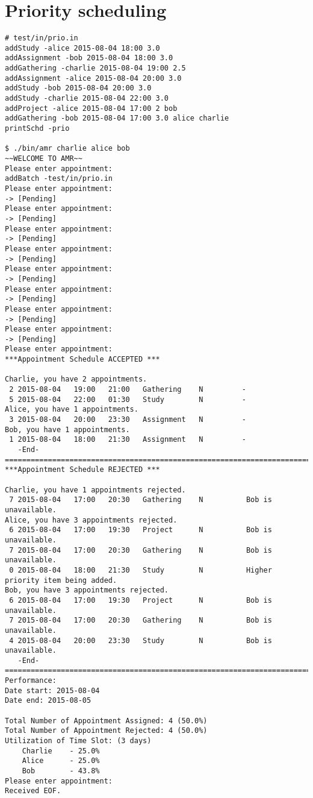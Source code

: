 \documentclass[12pt,a4paper]{report}
\begin{document}
\section{Priority scheduling}
\begin{lstlisting}
# test/in/prio.in
addStudy -alice 2015-08-04 18:00 3.0
addAssignment -bob 2015-08-04 18:00 3.0
addGathering -charlie 2015-08-04 19:00 2.5
addAssignment -alice 2015-08-04 20:00 3.0
addStudy -bob 2015-08-04 20:00 3.0
addStudy -charlie 2015-08-04 22:00 3.0
addProject -alice 2015-08-04 17:00 2 bob
addGathering -bob 2015-08-04 17:00 3.0 alice charlie
printSchd -prio

$ ./bin/amr charlie alice bob
~~WELCOME TO AMR~~
Please enter appointment:
addBatch -test/in/prio.in
Please enter appointment:
-> [Pending]
Please enter appointment:
-> [Pending]
Please enter appointment:
-> [Pending]
Please enter appointment:
-> [Pending]
Please enter appointment:
-> [Pending]
Please enter appointment:
-> [Pending]
Please enter appointment:
-> [Pending]
Please enter appointment:
-> [Pending]
Please enter appointment:
***Appointment Schedule ACCEPTED ***

Charlie, you have 2 appointments.
 2 2015-08-04   19:00   21:00   Gathering    N         -
 5 2015-08-04   22:00   01:30   Study        N         -
Alice, you have 1 appointments.
 3 2015-08-04   20:00   23:30   Assignment   N         -
Bob, you have 1 appointments.
 1 2015-08-04   18:00   21:30   Assignment   N         -
   -End-
===========================================================================
***Appointment Schedule REJECTED ***

Charlie, you have 1 appointments rejected.
 7 2015-08-04   17:00   20:30   Gathering    N          Bob is unavailable.
Alice, you have 3 appointments rejected.
 6 2015-08-04   17:00   19:30   Project      N          Bob is unavailable.
 7 2015-08-04   17:00   20:30   Gathering    N          Bob is unavailable.
 0 2015-08-04   18:00   21:30   Study        N          Higher priority item being added.
Bob, you have 3 appointments rejected.
 6 2015-08-04   17:00   19:30   Project      N          Bob is unavailable.
 7 2015-08-04   17:00   20:30   Gathering    N          Bob is unavailable.
 4 2015-08-04   20:00   23:30   Study        N          Bob is unavailable.
   -End-
===========================================================================
Performance:
Date start: 2015-08-04
Date end: 2015-08-05

Total Number of Appointment Assigned: 4 (50.0%)
Total Number of Appointment Rejected: 4 (50.0%)
Utilization of Time Slot: (3 days)
    Charlie    - 25.0%
    Alice      - 25.0%
    Bob        - 43.8%
Please enter appointment:
Received EOF.
\end{lstlisting}
\end{document}
